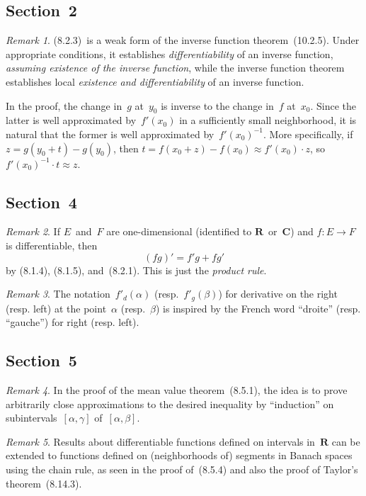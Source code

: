 \documentclass[letterpaper,12pt]{article}
\newcommand{\R}{\mathbf{R}}
\newcommand{\C}{\mathbf{C}}
\newcommand{\at}{\cdot}
\newcommand{\inv}[1]{#1^{-1}}
\theoremstyle{plain}
\theoremstyle{definition}
\theoremstyle{remark}
\newtheorem*{rmk}{Remark}
\begin{document}
\subsection*{Section~2}
\begin{rmk}
(8.2.3)~is a weak form of the inverse function theorem~(10.2.5). Under appropriate conditions, it establishes \emph{differentiability} of an inverse function, \emph{assuming existence of the inverse function}, while the inverse function theorem establishes local \emph{existence and differentiability} of an inverse function.

In the proof, the change in~\(g\) at~\(y_0\) is inverse to the change in~\(f\) at~\(x_0\). Since the latter is well approximated by~\(f'(x_0)\) in a sufficiently small neighborhood, it is natural that the former is well approximated by~\(\inv{f'(x_0)}\). More specifically, if \(z=g(y_0+t)-g(y_0)\), then \(t=f(x_0+z)-f(x_0)\approx f'(x_0)\at z\), so \(\inv{f'(x_0)}\at t\approx z\).
\end{rmk}

\subsection*{Section~4}
\begin{rmk}
If \(E\)~and~\(F\) are one-dimensional (identified to \(\R\)~or~\(\C\)) and \(f:E\to F\) is differentiable, then
\[(fg)'=f'g+fg'\]
by (8.1.4), (8.1.5), and~(8.2.1). This is just the \emph{product rule}.
\end{rmk}

\begin{rmk}
The notation~\(f'_d(\alpha)\) (resp.~\(f'_g(\beta)\)) for derivative on the right (resp. left) at the point~\(\alpha\) (resp.~\(\beta\)) is inspired by the French word ``droite'' (resp. ``gauche'') for right (resp. left).
\end{rmk}

\subsection*{Section~5}
\begin{rmk}
In the proof of the mean value theorem~(8.5.1), the idea is to prove arbitrarily close approximations to the desired inequality by ``induction'' on subintervals~\([\alpha,\gamma]\) of~\([\alpha,\beta]\).
\end{rmk}

\begin{rmk}
Results about differentiable functions defined on intervals in~\(\R\) can be extended to functions defined on (neighborhoods of) segments in Banach spaces using the chain rule, as seen in the proof of~(8.5.4) and also the proof of Taylor's theorem~(8.14.3).
\end{rmk}
\end{document}
